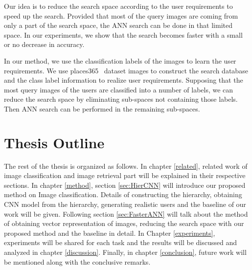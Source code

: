 Our idea is to reduce the search space according to the user requirements to speed up the search. 
Provided that most of the query images are coming from only a part of the search space, the ANN search can be done in that limited space. 
In our experiments, we show that the search becomes faster with a small or no decrease in accuracy.

In our method, we use the classification labels of the images to learn the user requirements. 
We use places365~\cite{zhou2017places} dataset images to construct the search database and the class label information to realize user requirements.
Supposing that the most query images of the users are classified into a number of labels, we can reduce the search space by eliminating sub-spaces not containing those labels.
Then ANN search can be performed in the remaining sub-spaces.


\section{Thesis Outline}

The rest of the thesis is organized as follows. 
In chapter \ref{related}, related work of image classification and image retrieval part will be explained in their respective sections. In chapter \ref{method}, section \ref{sec:HierCNN} will introduce our proposed method on Image classification. 
Details of constructing the hierarchy, obtaining CNN model from the hierarchy, generating realistic users and the baseline of our work will be given. 
Following section \ref{sec:FasterANN} will talk about the method of obtaining vector representation of images, reducing the search space with our proposed method and the baseline in detail.
In Chapter \ref{experiments}, experiments will be shared for each task and the results will be discussed and analyzed in chapter \ref{discussion}. Finally, in chapter \ref{conclusion}, future work will be mentioned along with the conclusive remarks.

